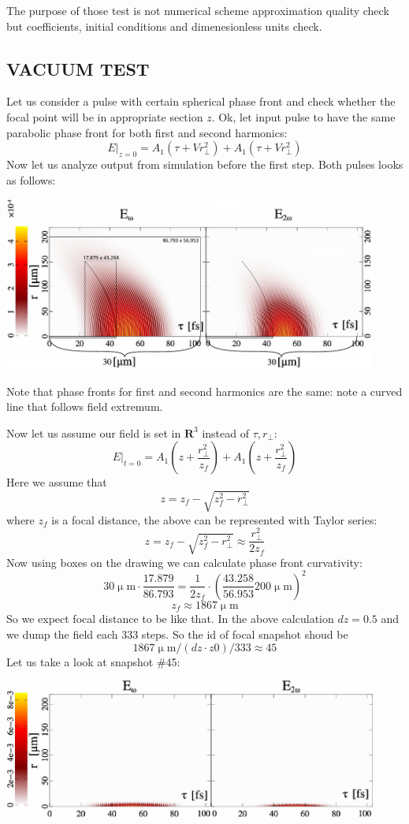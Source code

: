 \documentclass{article}
\newcommand{\ff}{\frac}
\newcommand{\mum}{\upmu\mathrm{m}}
\begin{document}
\noindent
The purpose of those test is not numerical scheme approximation quality check but coefficients, initial conditions and dimenesionless units check.
\newpage
\subsection{VACUUM TEST}
Let us consider a pulse with certain spherical phase front and check whether the focal point will be in appropriate section $z$.
Ok, let input pulse to have the same parabolic phase front for both first and second harmonics:
\[ E|_{z=0} = A_1(\tau + V r_\perp^2) + A_1(\tau + V r_\perp^2) \]
Now let us analyze output from simulation before the first step. Both pulses looks as follows:

\centerline{\includegraphics[width=12.3cm]{test/spatial.pdf}}

\noindent
Note that phase fronts for first and second harmonics are the same: note a curved line that follows field extremum.

\noindent
Now let us assume our field is set in $\mathrm{\mathbf{R}}^3$ instead of $\tau, r_\perp$:
\[ E|_{t=0} = A_1\left(z + \ff{r_\perp^2}{z_f}\right) + A_1\left(z + \ff{r_\perp^2}{z_f}\right) \]
Here we assume that
\[ z = z_f - \sqrt{z_f^2-r_\perp^2} \]
where $z_f$ is a focal distance, the above can be represented with Taylor series:
\[ z = z_f - \sqrt{z_f^2-r_\perp^2} \approx \ff{r_\perp^2}{2 z_f} \]
Now using boxes on the drawing we can calculate phase front curvativity:
\[ 30 \mum \cdot \ff{17.879}{86.793} = \ff{1}{2 z_f} \cdot \left(\ff{43.258}{56.953} 200 \mum\right)^2 \]
\[ z_f \approx 1867 \mum\]
So we expect focal distance to be like that. In the above calculation $dz=0.5$ and we dump the field each 333 steps. So the id of focal snapshot shoud be
\[ 1867 \mum / (dz \cdot z0) / 333 \approx 45 \]
Let us take a look at snapshot \#45:

\centerline{\includegraphics[width=12.3cm]{test/spatial45.pdf}}
\end{document}
